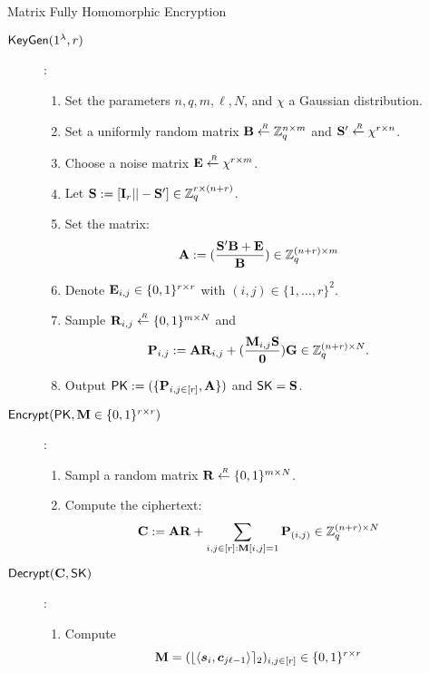  
  \begin{subsection}{Matrix Fully Homomorphic Encryption~\cite{DBLP:conf/pkc/HiromasaAO15}}
    \begin{description}
    \item[${\mathsf{KeyGen}} (1^\lambda, r)$]:
      \begin{enumerate}
      \item Set the parameters $n, q, m, \ell, N$, and $\chi$ a Gaussian distribution.
      \item Set a uniformly random matrix $\mathbf{B} \stackrel{{\scriptscriptstyle \mkern4mu R}}{\gets} \mathbb{Z}_q^{n \times m}$ and $\mathbf{S'} \stackrel{{\scriptscriptstyle \mkern4mu R}}{\gets} \chi^{r \times n}$.
      \item Choose a noise matrix $\mathbf{E} \stackrel{{\scriptscriptstyle \mkern4mu R}}{\gets} \chi^{r \times m}$.
      \item Let $\mathbf{S}:= [\mathbf{I}_r || - \mathbf{S}'] \in \mathbb{Z}_q^{r \times (n+r)}$.
      \item Set the matrix:
        \begin{align*}
          \mathbf{A} &:= (\frac{\mathbf{S}'\mathbf{B} + \mathbf{E}}{\mathbf{B}}) \in \mathbb{Z}_q^{(n+r) \times m}
        \end{align*}
      \item Denote $\mathbf{E}_{i,j} \in \{0, 1\}^{r\times r}$ with $(i,j) \in \{1, \dots ,r\}^2$.
      \item Sample $\mathbf{R}_{i,j} \stackrel{{\scriptscriptstyle \mkern4mu R}}{\gets} \{0,1\}^{m \times N}$ and 
        \begin{align*}
          \mathbf{P}_{i,j} &:= \mathbf{A} \mathbf{R}_{i,j} + (\frac{\mathbf{M}_{i,j}\mathbf{S}}{\mathbf{0}}) \mathbf{G} \in \mathbb{Z}_q^{(n+r) \times N}.
        \end{align*}
      \item Output $\mathsf{PK} := (\{\mathbf{P}_{i,j \in [r]}, \mathbf{A}\})$ and $\mathsf{SK} = \mathbf{S}$.
      \end{enumerate}
 
    \item[${\mathsf{Encrypt}}(\mathsf{PK}, \mathbf{M} \in \{0,1\}^{r \times r})$] :
      \begin{enumerate}
      \item Sampl a random matrix $\mathbf{R} \stackrel{{\scriptscriptstyle \mkern4mu R}}{\gets} \{0,1\}^{m \times N}$.
      \item Compute the ciphertext:
        \begin{align*}
          \mathbf{C} &:= \mathbf{A} \mathbf{R} + \sum_{i,j \in [r] : \mathbf{M}[i,j] = 1} \mathbf{P}_{(i,j)} \in \mathbb{Z}_q^{(n+r) \times N}
        \end{align*}
      \end{enumerate}
 
    \item[${\mathsf{Decrypt}}(\mathbf{C}, \mathsf{SK})$]:
      \begin{enumerate}
      \item Compute
        \begin{align*}
          \mat{M} &=(\round{\langle \vec{s}_i, \vec{c}_{j\ell-1} \rangle}_2)_{i,j \in [r]} \in \{0,1\}^{r \times r}
        \end{align*}
      \end{enumerate}
    \end{description}
  \end{subsection}

